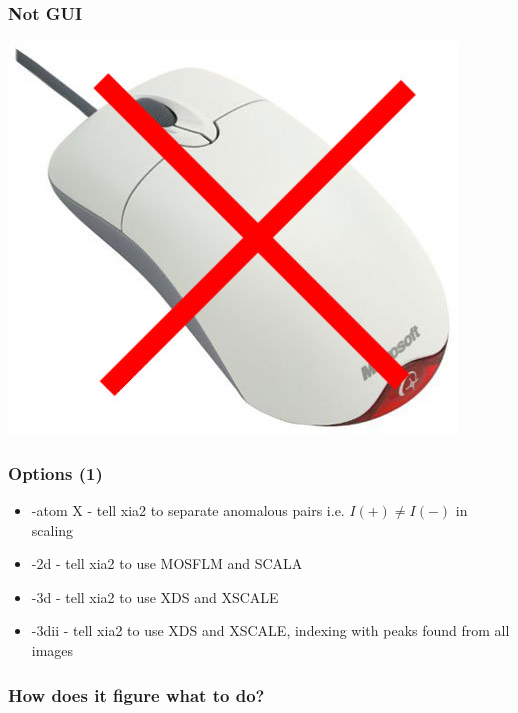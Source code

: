 \documentclass[slides,compress]{beamer}
\begin{document}
\begin{frame}
\frametitle{Not GUI}
\begin{center}
\includegraphics[scale=0.40]{figures/no-mouse.jpg}
\end{center}
\end{frame}

\begin{frame}
\frametitle{Options (1)}
\begin{itemize}
\item{-atom X - tell xia2 to separate anomalous pairs i.e. $I(+) \ne I(-)$ in 
scaling}
\item{-2d - tell xia2 to use MOSFLM and SCALA}
\item{-3d - tell xia2 to use XDS and XSCALE}
\item{-3dii - tell xia2 to use XDS and XSCALE, indexing with peaks found from
all images}
\end{itemize}
\end{frame}

\begin{frame}
\frametitle{How does it figure what to do?}
\begin{itemize}
\end{itemize}
\end{frame}
\end{document}
